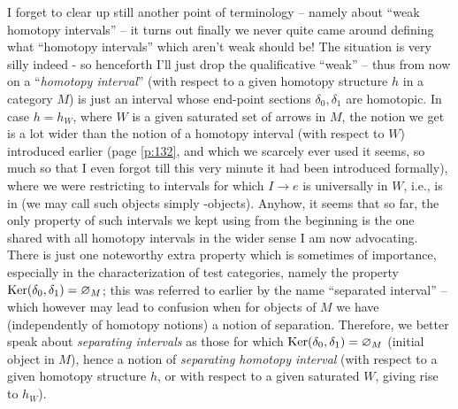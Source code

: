I forget to clear up still another point of terminology -- namely
about ``weak homotopy intervals'' -- it turns out finally we never
quite came around defining what ``homotopy intervals'' which aren't
weak should be! The situation is very silly indeed - so henceforth
I'll just drop the qualificative ``weak'' -- thus from now
on a ``\emph{homotopy interval}'' (with respect to a given homotopy
structure $h$ in a category $M$) is just an interval whose end-point
sections $\delta_0,\delta_1$ are homotopic. In case $h=h_W$, where $W$
is a given saturated set of arrows in $M$, the notion we get is a lot
wider than the notion of a homotopy interval (with respect to $W$)
introduced earlier (page \ref{p:132}, and which we scarcely ever used
it seems, so much so that I even forgot till this very minute it had
been introduced formally), where we were restricting to intervals for
which $I\to e$ is universally in $W$, i.e., is in \UW{} (we may call
such objects simply \UW-objects). Anyhow, it seems that so far, the
only property of such intervals we kept using from the beginning is
the one shared with all homotopy intervals in the wider sense I am now
advocating. There is just one noteworthy extra property which is
sometimes of importance, especially in the characterization of test
categories, namely the property $\operatorname{Ker}(\delta_0,\delta_1)=\varnothing_M$;
this was referred to earlier by the name ``separated interval'' --
which however may lead to confusion when for objects of $M$ we have
(independently of homotopy notions) a notion of separation. Therefore,
we better speak about \emph{separating intervals} as those for which
$\operatorname{Ker}(\delta_0,\delta_1)=\varnothing_M$ (initial object in $M$), hence a
notion of \emph{separating homotopy interval} (with respect to a given
homotopy structure $h$, or with respect to a given saturated $W$,
giving rise to $h_W$).

